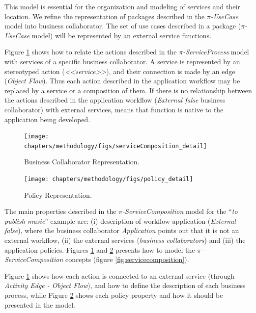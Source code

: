 %  
 This model is essential for the organization and modeling of
 services and their location. We refine the representation of packages
 described in the  \textit{$\pi$-UseCase} model into business
 collaborator. The set of use cases described in a package
 (\textit{$\pi$-UseCase} model) will be represented by an external service
 functions.
 
 Figure \ref{fig:businesscollaborator_detail} shows how to relate the actions
 described in the \textit{$\pi$-ServiceProcess} model with services of a specific business
 collaborator. A service is represented by an stereotyped action 
 (\textit{<<service>>}), and their connection is made by an edge (\textit{Object
 Flow}). Thus each action described in the application workflow may be
 replaced by a service or a composition of them. If there is no relationship
 between the actions described in the application workflow (\textit{External
 false} business collaborator) with external services, means that function
 is native to the application being developed.
    
\begin{figure}[ht!] 
\centering
\texttt{[image: chapters/methodology/figs/serviceComposition\_detail]}
\caption{Business Collaborator Representation.}
\label{fig:businesscollaborator_detail}
\end{figure}
  
\begin{figure}[ht!] 
\centering
\texttt{[image: chapters/methodology/figs/policy\_detail]}
\caption{Policy Representation.}
\label{fig:policy_detail}
\end{figure} 

The main properties described in the  \textit{$\pi$-ServiceComposition} model
for the ``\textit{to publish music}'' example are: (i) description of workflow
application (\textit{External false}), where the business collaborator \textit{Application} points out that it is not an
external workflow, (ii) the external services (\textit{business collaborators})
and (iii) the application policies. Figures
\ref{fig:businesscollaborator_detail} and \ref{fig:policy_detail} presents how
to model the \textit{$\pi$-ServiceComposition} concepts (figure
\ref{fig:servicecomposition}).

Figure \ref{fig:businesscollaborator_detail} shows how each action is connected to an external service
(through \textit{Activity Edge - Object Flow}), and how to define the
description of each business process, while Figure  \ref{fig:policy_detail} shows each
policy property and how it should be presented in the model. 

